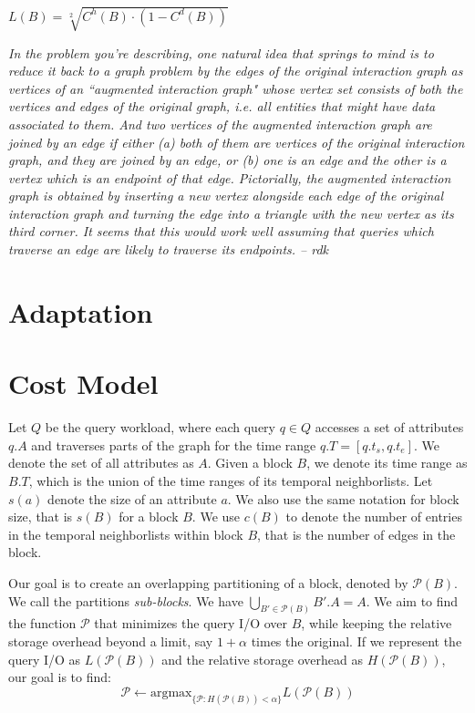 \documentclass{sig-alternate}
\begin{document}
$L(B) = \sqrt[2]{C^h(B) \cdot ( 1 - C^d(B))}$


\emph{In the problem you're describing, one natural idea that springs to mind is
  to reduce it back to a graph problem by the edges of the original interaction
  graph as vertices of an ``augmented interaction graph" whose vertex set
  consists of both the vertices and edges of the original graph, i.e. all
  entities that might have data associated to them. And two vertices of the
  augmented interaction graph are joined by an edge if either (a) both of them
  are vertices of the original interaction graph, and they are joined by an
  edge, or (b) one is an edge and the other is a vertex which is an endpoint of
  that edge. Pictorially, the augmented interaction graph is obtained by
  inserting a new vertex alongside each edge of the original interaction graph
  and turning the edge into a triangle with the new vertex as its third
  corner. It seems that this would work well assuming that queries which
  traverse an edge are likely to traverse its endpoints. -- rdk}

\section{Adaptation}

\section{Cost Model}

Let $Q$ be the query workload, where each query $q\in Q$ accesses a set of
attributes $q.A$ and traverses parts of the graph for the time range
$q.T=[q.t_s,q.t_e]$. We denote the set of all attributes as $A$. Given a block
$B$, we denote its time range as $B.T$, which is the union of the time ranges
of its temporal neighborlists. Let $s(a)$ denote the size of an attribute $a$.
We also use the same notation for block size, that is $s(B)$ for a block $B$. 
We use $c(B)$ to denote the number of entries in the temporal neighborlists
within block $B$, that is the number of edges in the block. 

Our goal is to create an overlapping partitioning of a block, denoted by
$\mathcal{P}(B)$. We call the partitions \emph{sub-blocks}. We have
$\bigcup_{B'\in \mathcal{P}(B)} B'.A = A$. We aim to find the function
$\mathcal{P}$ that minimizes the query I/O over $B$, while keeping the
relative storage overhead beyond a limit, say $1+\alpha$ times the original.
If we represent the query I/O as $L(\mathcal{P}(B))$ and the relative storage
overhead as $H(\mathcal{P}(B))$, our goal is to find:
\begin{equation}
\mathcal{P} \leftarrow \mbox{argmax}_{\{\mathcal{P}: H(\mathcal{P}(B)) < \alpha\}} L(\mathcal{P}(B))
\end{equation}
\end{document}
